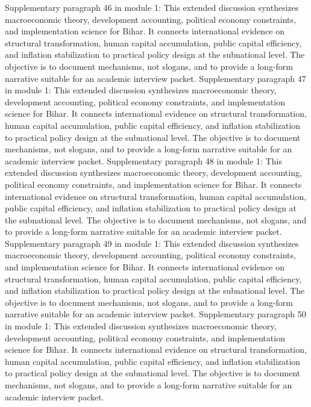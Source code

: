 \documentclass[preprint,12pt]{elsarticle}
\begin{document}
Supplementary paragraph 46 in module 1: This extended discussion synthesizes macroeconomic theory, development accounting, political economy constraints, and implementation science for Bihar. It connects international evidence on structural transformation, human capital accumulation, public capital efficiency, and inflation stabilization to practical policy design at the subnational level. The objective is to document mechanisms, not slogans, and to provide a long-form narrative suitable for an academic interview packet.
Supplementary paragraph 47 in module 1: This extended discussion synthesizes macroeconomic theory, development accounting, political economy constraints, and implementation science for Bihar. It connects international evidence on structural transformation, human capital accumulation, public capital efficiency, and inflation stabilization to practical policy design at the subnational level. The objective is to document mechanisms, not slogans, and to provide a long-form narrative suitable for an academic interview packet.
Supplementary paragraph 48 in module 1: This extended discussion synthesizes macroeconomic theory, development accounting, political economy constraints, and implementation science for Bihar. It connects international evidence on structural transformation, human capital accumulation, public capital efficiency, and inflation stabilization to practical policy design at the subnational level. The objective is to document mechanisms, not slogans, and to provide a long-form narrative suitable for an academic interview packet.
Supplementary paragraph 49 in module 1: This extended discussion synthesizes macroeconomic theory, development accounting, political economy constraints, and implementation science for Bihar. It connects international evidence on structural transformation, human capital accumulation, public capital efficiency, and inflation stabilization to practical policy design at the subnational level. The objective is to document mechanisms, not slogans, and to provide a long-form narrative suitable for an academic interview packet.
Supplementary paragraph 50 in module 1: This extended discussion synthesizes macroeconomic theory, development accounting, political economy constraints, and implementation science for Bihar. It connects international evidence on structural transformation, human capital accumulation, public capital efficiency, and inflation stabilization to practical policy design at the subnational level. The objective is to document mechanisms, not slogans, and to provide a long-form narrative suitable for an academic interview packet.
\end{document}
